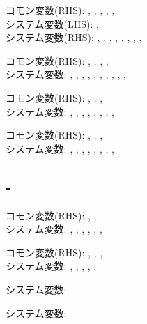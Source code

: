 \begin{hosoku}\small
コモン変数(RHS): , , , , , \\
システム変数(LHS): , \\
システム変数(RHS): , , , , , , , , 
\end{hosoku}

\begin{hosoku}\small
コモン変数(RHS): , , , , \\
システム変数: , , , , , , , , , , 
\end{hosoku}

\begin{hosoku}\small
コモン変数(RHS): , , , \\
システム変数: , , , , , , , , 
\end{hosoku}

\begin{hosoku}\small
コモン変数(RHS): , , , \\
システム変数: , , , , , , , , 
\end{hosoku}

\subsection{-}
\begin{hosoku}\small
コモン変数(RHS): , , \\
システム変数: , , , , , , 
\end{hosoku}

\begin{hosoku}\small
コモン変数(RHS): , , , \\
システム変数: , , , , , 
\end{hosoku}

\begin{hosoku}\small
システム変数: 
\end{hosoku}

\begin{hosoku}\small
システム変数: 
\end{hosoku}
